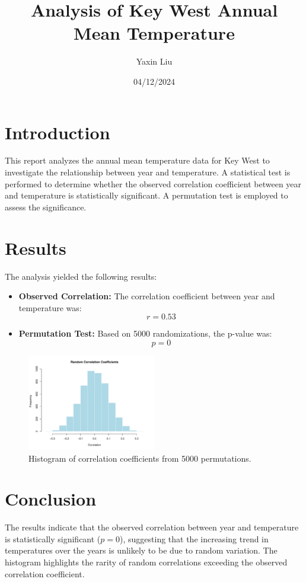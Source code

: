 \documentclass[a4paper,10pt]{article}
\title{\textbf{Analysis of Key West Annual Mean Temperature}}
\author{Yaxin Liu}
\date{04/12/2024}
\begin{document}
\maketitle
\section*{Introduction}
This report analyzes the annual mean temperature data for Key West to investigate the relationship between year and temperature. A statistical test is performed to determine whether the observed correlation coefficient between year and temperature is statistically significant. A permutation test is employed to assess the significance.
\section*{Results}
The analysis yielded the following results:
\begin{itemize}
    \item \textbf{Observed Correlation:} The correlation coefficient between year and temperature was:
    \[
    r = 0.53
    \]
    \item \textbf{Permutation Test:} Based on 5000 randomizations, the p-value was:
    \[
    p = 0
    \]
\end{itemize}
\begin{figure}[h!]
    \centering
    \includegraphics[width=0.5\textwidth, height=0.3\textheight]{../results/Florida.pdf}
    \caption{Histogram of correlation coefficients from 5000 permutations. }
    \label{fig:histogram}
\end{figure}
\section*{Conclusion}
The results indicate that the observed correlation between year and temperature is statistically significant (\(p = 0\)), suggesting that the increasing trend in temperatures over the years is unlikely to be due to random variation. The histogram highlights the rarity of random correlations exceeding the observed correlation coefficient.
\immediate{}
\end{document}

